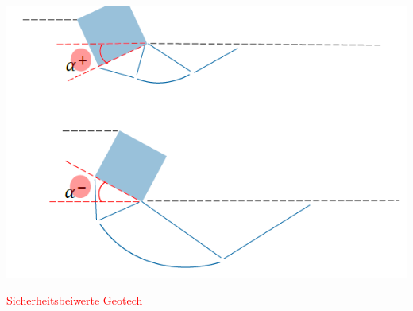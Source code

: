 \begin{minipage}{0.2\linewidth}
	\includegraphics[width=\linewidth]{images/Flachfun4Winkel.PNG} \\
	
\end{minipage}


\textcolor{red}{Sicherheitsbeiwerte Geotech}



	
%			
%				
%			
%						



